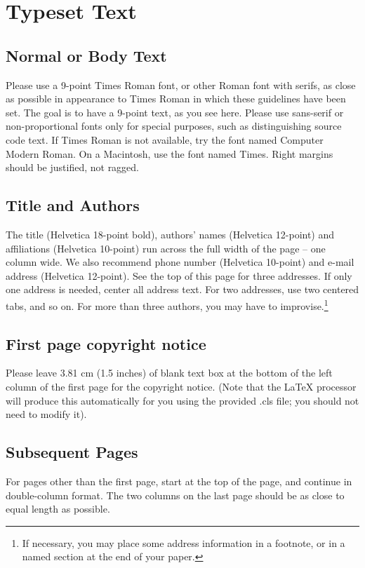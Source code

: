 \documentclass{ipres_proc_article-sp}
\begin{document}
\section{Typeset Text}
\subsection{Normal or Body Text}
Please use a 9-point Times Roman font, or other Roman font with serifs,
as close as possible in appearance to Times Roman in which these
guidelines have been set. The goal is to have a 9-point text, as
you see here. Please use sans-serif or non-proportional fonts only
for special purposes, such as distinguishing source code text. If
Times Roman is not available, try the font named Computer Modern
Roman. On a Macintosh, use the font named Times.  Right margins
should be justified, not ragged.

\subsection{Title and Authors}
The title (Helvetica 18-point bold), authors' names (Helvetica 12-point)
and affiliations (Helvetica 10-point) run across the full width of
the page -- one column wide. We also recommend phone number (Helvetica
10-point) and e-mail address (Helvetica 12-point). See the top of
this page for three addresses. If only one address is needed, center
all address text. For two addresses, use two centered tabs, and so on.
For more than three authors, you may have to improvise.\footnote{If
necessary, you may place some address information in a footnote, or
in a named section at the end of your paper.}

\subsection{First page copyright notice}
Please leave 3.81 cm (1.5 inches) of blank text box at the bottom of the
left column of the first page for the copyright notice. (Note that the
LaTeX processor will produce this automatically for you using the 
provided .cls file; you should not need to modify it).

\subsection{Subsequent Pages}
For pages other than the first page, start at the top of the page, and
continue in double-column format.  The two columns on the last page
should be as close to equal length as possible.
\end{document}
